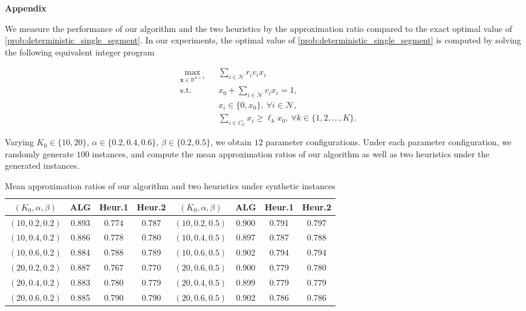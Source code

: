 \documentclass[msom,non-blindrev]{informs3} %
\theoremstyle{definition}
\begin{document}
\begin{appendices}{\Large \noindent\textbf{Appendix}}
{We measure the performance of our algorithm and the two heuristics by the approximation ratio compared to the exact optimal value of \eqref{prob:deterministic_single_segment}. In our experiments, the optimal value of \eqref{prob:deterministic_single_segment} is computed by solving the following equivalent integer program

\begin{equation*}
\begin{aligned}
&\max_{\mathbf{x}\in\mathbb{R}^{n+1}}&&\sum_{i\in\mathcal{N}}r_iv_ix_i\\
&\text{s.t.}&& x_0+\sum_{i\in\mathcal{N}}v_ix_i=1,\\
&&& x_i\in\{0,x_0\},\ \forall i\in\mathcal{N},\\
&&& \sum_{i\in C_k}x_i\geq \ell_kx_0,\ \forall k\in\{1,2,\dots,K\}.
\end{aligned}
\end{equation*}

Varying $K_0\in\{10,20\}$, $\alpha\in\{0.2,0.4,0.6\}$, $\beta\in\{0.2,0.5\}$, we obtain $12$ parameter configurations. Under each parameter configuration, we randomly generate $100$ instances, and compute the mean approximation ratios of our algorithm as well as two heuristics under the generated instances.

\begin{table}[!ht]
\centering
\begin{tabular}{|c|c c c||c|c c c|}
\hline
$(K_0,\alpha,\beta)$&ALG&Heur.1&Heur.2&$(K_0,\alpha,\beta)$&ALG&Heur.1&Heur.2\\
\hline
$(10,0.2,0.2)$&0.893&0.774&0.787&$(10,0.2,0.5)$&0.900&0.791&0.797\\
$(10,0.4,0.2)$&0.886&0.778&0.780&$(10,0.4,0.5)$&0.897&0.787&0.788\\
$(10,0.6,0.2)$&0.884&0.788&0.789&$(10,0.6,0.5)$&0.902&0.794&0.794\\
\hline
$(20,0.2,0.2)$&0.887&0.767&0.770&$(20,0.6,0.5)$&0.900&0.779&0.780\\
$(20,0.4,0.2)$&0.883&0.780&0.779&$(20,0.4,0.5)$&0.899&0.779&0.779\\
$(20,0.6,0.2)$&0.885&0.790&0.790&$(20,0.6,0.5)$&0.902&0.786&0.786\\
\hline
\end{tabular}
\caption{Mean approximation ratios of our algorithm and two heuristics under synthetic instances}
\label{table:mean_approx_ratio}
\end{table}

}
\end{appendices}
\end{document}
